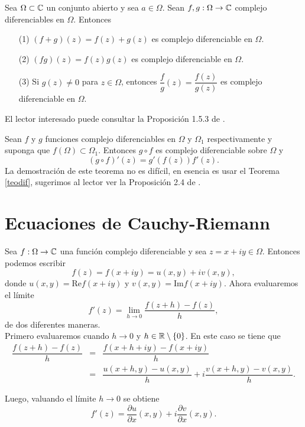 \begin{prop}
	Sea $\Omega\subset \mathbb{C}$ un conjunto abierto y sea $a \in \Omega$. Sean $f,g:\Omega\rightarrow\mathbb{C}$ complejo diferenciables en $\Omega$. Entonces 
	\begin{itemize}
		\item [(1)] $(f+g)(z)=f(z)+g(z)$ es complejo diferenciable en $\Omega$.
		\item [(2)] $(fg)(z)=f(z)g(z)$ es complejo diferenciable en $\Omega$.
		\item [(3)] Si $g(z)\neq 0$ para $z\in\Omega$, entonces $\dfrac{f}{g}(z) = \dfrac{f(z)}{g(z)}$ es complejo diferenciable en $\Omega$.
	\end{itemize} 
\end{prop}
El lector interesado puede consultar la Proposición 1.5.3 de \cite{marsden}. 
\begin{teor}
	Sean $f$ y $g$ funciones complejo diferenciables en $\Omega$ y $\Omega_{1}$ respectivamente y suponga que $f(\Omega)\subset\Omega_{1}$. Entonces $g\circ f$ es complejo diferenciable sobre $\Omega$ y 
	$$(g\circ f)'(z)=g'(f(z))f'(z).$$
	La demostración de este teorema no es difícil, en esencia es usar el Teorema \ref{teodif}, sugerimos al lector ver la Proposición 2.4 de \cite{Conway}.


\end{teor}
\section{Ecuaciones de Cauchy-Riemann} \label{sec:Cauchy-Riemann}

Sea $f:\Omega\rightarrow\mathbb{C}$ una función complejo diferenciable y sea $z=x+iy\in \Omega$. Entonces podemos escribir
$$f(z)=f(x+iy)=u(x,y)+iv(x,y),$$
donde $u(x,y)=\mathrm{Re } f(x+iy)$ y $v(x,y)=\mathrm{Im } f(x+iy)$. Ahora evaluaremos el límite 
$$f'(z)=\lim_{h\rightarrow 0}\dfrac{f(z+h)-f(z)}{h},$$
de dos diferentes maneras.\\
Primero evaluaremos cuando $h\rightarrow 0$ y $h\in \mathbb{R}\setminus\{0\}$. En este caso  se tiene que
\[
\begin{array}{ccl}
	\dfrac{f(z+h)-f(z)}{h}&=&\dfrac{f(x+h+iy)-f(x+iy)}{h}\\
	&=&\dfrac{u(x+h,y)-u(x,y)}{h}+i\dfrac{v(x+h,y)-v(x,y)}{h}.
\end{array}
\]

Luego, valuando el límite $h\rightarrow 0$ se obtiene
\begin{equation}\label{ec2}
	f'(z)=\dfrac{\partial u}{\partial x}(x,y)+i\dfrac{\partial v}{\partial x}(x,y).
\end{equation}

